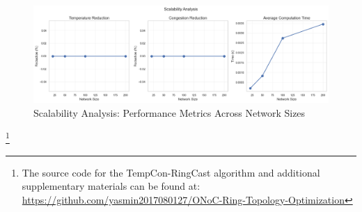 \documentclass[conference]{IEEEtran}
\begin{document}
\begin{figure}[h]
    \centering
    \includegraphics[width=\linewidth]{scalability.png}
    \caption{Scalability Analysis: Performance Metrics Across Network Sizes}
    \label{fig:scalability}
\end{figure}

\footnote{The source code for the TempCon-RingCast algorithm and additional supplementary materials can be found at: \href{https://github.com/yasmin2017080127/ONoC-Ring-Topology-Optimization}{https://github.com/yasmin2017080127/ONoC-Ring-Topology-Optimization}}



\end{document}
